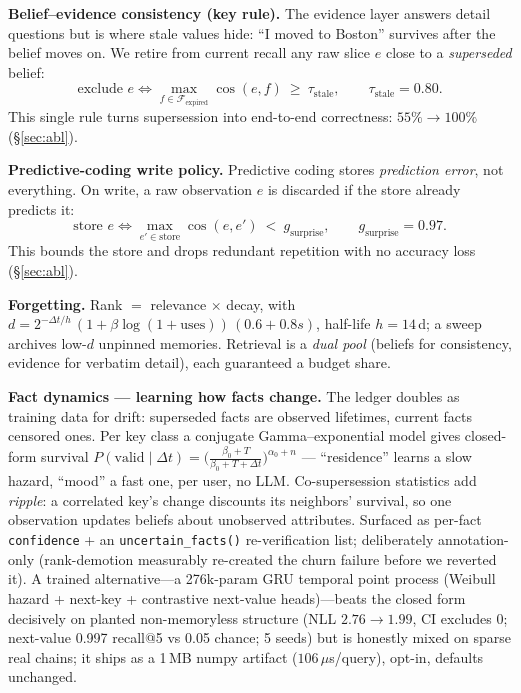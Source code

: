 \documentclass[11pt]{article}
\begin{document}
\textbf{Belief--evidence consistency (key rule).} The evidence layer answers detail
questions but is where stale values hide: ``I moved to Boston'' survives after the belief
moves on. We retire from current recall any raw slice $e$ close to a \emph{superseded} belief:
\[
\text{exclude } e \iff \max_{f\in\mathcal{F}_{\text{expired}}}\cos(e,f)\ \ge\ \tau_{\text{stale}},
\qquad \tau_{\text{stale}}=0.80.
\]
This single rule turns supersession into end-to-end correctness: $55\%\!\to\!100\%$
(\S\ref{sec:abl}).

\textbf{Predictive-coding write policy.} Predictive coding stores \emph{prediction error},
not everything. On write, a raw observation $e$ is discarded if the store already predicts it:
\[
\text{store } e \iff \max_{e'\in\text{store}}\cos(e,e')\ <\ g_{\text{surprise}},
\qquad g_{\text{surprise}}=0.97 .
\]
This bounds the store and drops redundant repetition with no accuracy loss (\S\ref{sec:abl}).

\textbf{Forgetting.} Rank $=$ relevance $\times$ decay, with
$d = 2^{-\Delta t/h}\,(1+\beta\log(1{+}\text{uses}))\,(0.6+0.8s)$, half-life $h=14$\,d; a
sweep archives low-$d$ unpinned memories. Retrieval is a \emph{dual pool} (beliefs for
consistency, evidence for verbatim detail), each guaranteed a budget share.

\textbf{Fact dynamics --- learning how facts change.} The ledger doubles as training
data for drift: superseded facts are observed lifetimes, current facts censored ones.
Per key class a conjugate Gamma--exponential model gives closed-form survival
$P(\text{valid}\mid\Delta t)=\big(\tfrac{\beta_0+T}{\beta_0+T+\Delta t}\big)^{\alpha_0+n}$
--- ``residence'' learns a slow hazard, ``mood'' a fast one, per user, no LLM.
Co-supersession statistics add \emph{ripple}: a correlated key's change discounts its
neighbors' survival, so one observation updates beliefs about unobserved attributes.
Surfaced as per-fact \texttt{confidence} + an \texttt{uncertain\_facts()}
re-verification list; deliberately annotation-only (rank-demotion measurably
re-created the churn failure before we reverted it). A trained alternative---a
276k-param GRU temporal point process (Weibull hazard + next-key + contrastive
next-value heads)---beats the closed form decisively on planted non-memoryless
structure (NLL $2.76\!\to\!1.99$, CI excludes 0; next-value 0.997 recall@5 vs 0.05
chance; 5 seeds) but is honestly mixed on sparse real chains; it ships as a 1\,MB
numpy artifact ($106\,\mu$s/query), opt-in, defaults unchanged.
\end{document}
